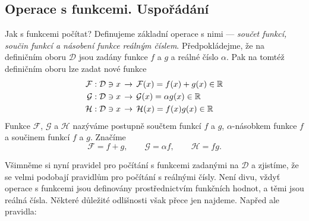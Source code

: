 {    \subsection{Operace s funkcemi. Uspořádání}
      Jak s funkcemi počítat? Definujeme základní operace s nimi — \emph{součet funkcí, součin 
      funkcí a násobení funkce reálným číslem}. Předpokládejme, že na definičním oboru 
      \(\mathcal{D}\) jsou zadány funkce \(f\) a \(g\) a reálné číslo \(\alpha\). Pak na tomtéž 
      definičním oboru lze zadat nové funkce
      \begin{align*}
        \mathcal{F} &: \mathcal{D}\ni x\,\rightarrow\,\mathcal{F}(x) = f(x)+g(x)  \in\mathbb{R}   \\
        \mathcal{G} &: \mathcal{D}\ni x\,\rightarrow\,\mathcal{G}(x) = \alpha g(x)\in\mathbb{R}   \\
        \mathcal{H} &: \mathcal{D}\ni x\,\rightarrow\,\mathcal{H}(x) = f(x) g(x)  \in\mathbb{R} 
      \end{align*}
      Funkce \(\mathcal{F}\), \(\mathcal{G}\) a \(\mathcal{H}\) nazýváme postupně součtem funkcí 
      \(f\) a \(g\), \(\alpha\)-násobkem funkce \(f\) a součinem funkcí \(f\) a \(g\). Značíme
      \begin{equation*}
       \mathcal{F} = f + g, \qquad \mathcal{G} = \alpha f, \qquad \mathcal{H} = fg. 
      \end{equation*}
      
      Všimněme si nyní pravidel pro počítání s funkcemi zadanými na \(\mathcal{D}\) a zjistíme, 
      že se velmi podobají pravidlům pro počítání s reálnými čísly. Není divu, vždyť operace s 
      funkcemi jsou definovány prostřednictvím funkčních hodnot, a těmi jsou reálná čísla. Některé 
      důležité odlišnosti však přece jen najdeme. Napřed ale pravidla:
      
}
